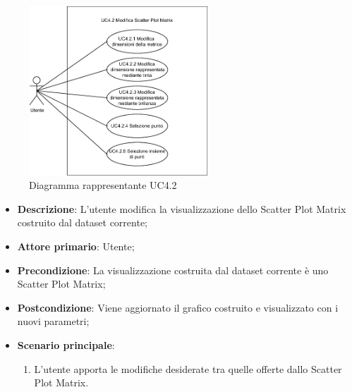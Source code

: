\begin{figure}[h]
    \centering
    \includegraphics[width=0.6\textwidth]{componenti/casi-duso/diagrammi/UC4_2.pdf}
    \caption{Diagramma rappresentante UC4.2}
    \label{fig:UC4.2}
\end{figure}


\begin{itemize}
    \item \textbf{Descrizione}: L’utente modifica la visualizzazione dello Scatter Plot Matrix
                                costruito dal dataset corrente;

    \item \textbf{Attore primario}: Utente;

    \item \textbf{Precondizione}:   La visualizzazione costruita dal dataset corrente è uno Scatter Plot Matrix;

    \item \textbf{Postcondizione}:  Viene aggiornato il grafico costruito e visualizzato con i nuovi parametri;

	\item \textbf{Scenario principale}:
		\begin{enumerate}
            \item L'utente apporta le modifiche desiderate tra quelle offerte dallo Scatter Plot Matrix.
        \end{enumerate}
\end{itemize}


